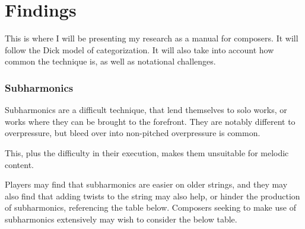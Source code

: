 
\chapter{Findings}
This is where I will be presenting my research as a manual for composers. 
It will follow the Dick model of categorization.\autocite{dickOtherFlute1989} 
It will also take into account how common the technique is, as well as notational challenges.

\subsection{Subharmonics}
Subharmonics are a difficult technique, that lend themselves to solo works, or works where they can be brought to the forefront.
They are notably different to overpressure, but bleed over into non-pitched overpressure is common.

This, plus the difficulty in their execution, makes them unsuitable for melodic content.

Players may find that subharmonics are easier on older strings, and they may also find that adding twists to the string may also help, or hinder the production of subharmonics, referencing the table below. 
Composers seeking to make use of subharmonics extensively may wish to consider the below table.

